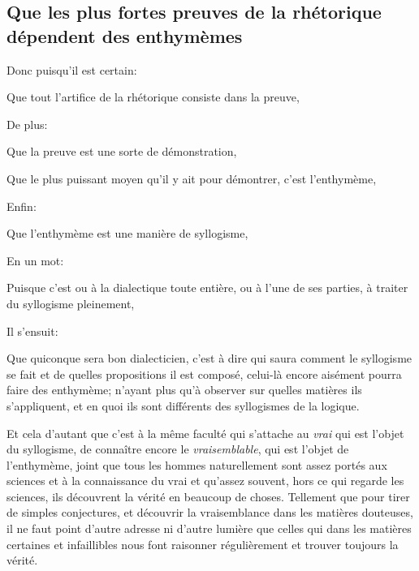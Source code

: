\subsection{Que les plus fortes preuves de la rhétorique dépendent des enthymèmes}

Donc puisqu'il est certain:

\begin{emphpar}
      Que tout l'artifice de la rhétorique consiste dans la preuve,
\end{emphpar}

De plus:

\begin{emphpar}
       Que la preuve est une sorte de démonstration,
       
      Que le plus puissant moyen qu'il y ait pour démontrer, c'est l'enthymème,
\end{emphpar}

Enfin:

\begin{emphpar}
      Que l'enthymème est une manière de syllogisme,
\end{emphpar}

En un mot:

\begin{emphpar}
      Puisque c'est ou à la dialectique toute entière, ou à l'une de ses parties, à traiter du syllogisme pleinement,
\end{emphpar}

Il s'ensuit:

\begin{emphpar}
            Que quiconque sera bon dialecticien, c'est à dire qui saura comment le syllogisme se fait et de quelles propositions il est composé,
             celui-là encore aisément pourra faire des enthymème; n'ayant plus qu'à observer sur quelles matières ils s'appliquent, et en quoi ils
             sont différents des syllogismes de la logique.
\end{emphpar}

Et cela d'autant que c'est à la même faculté qui s'attache au \emph{vrai} qui est l'objet du syllogisme, de connaître encore le \emph{vraisemblable},
qui est l'objet de l'enthymème, joint que tous les hommes naturellement sont assez portés aux sciences et à la connaissance du vrai et qu'assez
souvent, hors ce qui regarde les sciences, ils découvrent la vérité en beaucoup de choses. Tellement que pour tirer de simples conjectures, et
découvrir la vraisemblance dans les matières douteuses, il ne faut point d'autre adresse ni d'autre lumière que celles qui dans les matières
certaines et infaillibles nous font raisonner régulièrement et trouver toujours la vérité.

